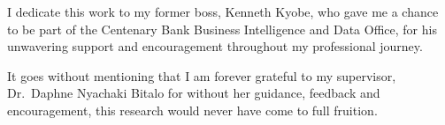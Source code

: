I dedicate this work to my former boss, Kenneth Kyobe, who gave me a chance to be part of the Centenary Bank Business Intelligence and Data Office, for his unwavering support and encouragement throughout my professional journey.

It goes without mentioning that I am forever grateful to my supervisor, Dr.\ Daphne Nyachaki Bitalo for without her guidance, feedback and encouragement, this research would never have come to full fruition.
